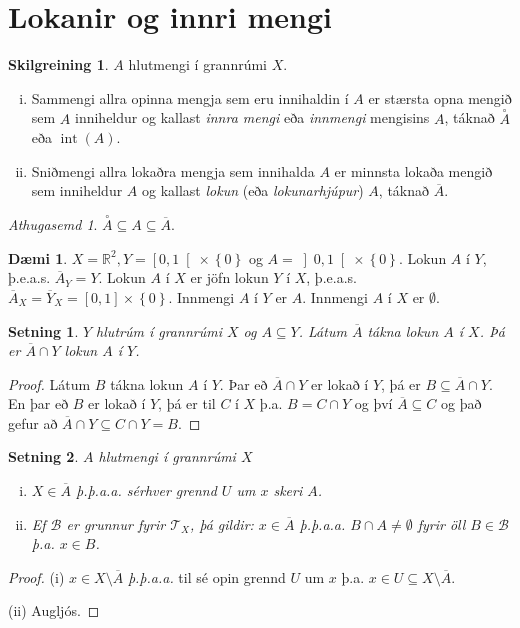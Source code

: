 \documentclass[a4paper,icelandic]{book}
\theoremstyle{definition}
\newtheorem{skilgr}{Skilgreining}[section]
\newtheorem{daemi}{Dæmi}[section]
\theoremstyle{plain}
\newtheorem{setn}{Setning}[section]
\theoremstyle{remark}
\newtheorem*{ath}{Athugasemd}
\newcommand{\R}{\mathbb{R}} %
\DeclareMathOperator{\innmengi}{int} %
\begin{document}
\section{Lokanir og innri mengi}
\begin{skilgr}
  $A$ hlutmengi í grannrúmi $X$.
  \begin{enumerate}[(i)]
  \item Sammengi allra opinna mengja sem eru innihaldin í $A$ er stærsta opna
    mengið sem $A$ inniheldur og kallast \emph{innra mengi}
    eða \emph{innmengi} mengisins $A$, táknað $\overset \circ A$
    eða $\innmengi(A)$.
  \item Sniðmengi allra lokaðra mengja sem innihalda $A$ er minnsta lokaða
    mengið sem inniheldur $A$ og kallast \emph{lokun} (eða
    \emph{lokunarhjúpur}) $A$, táknað $\overline A$.
  \end{enumerate}
\end{skilgr}
\begin{ath}
  $\overset \circ A \subseteq A \subseteq \overline A$.
\end{ath}
\begin{daemi}
  $X = \R^2, Y = \left[0,1\right[\times\left\{ 0 \right\}$ og $A =
  \left]0,1\right[\times\left\{ 0 \right\}$. Lokun $A$ í $Y$,
  þ.e.a.s. $\overline A_Y = Y$. Lokun $A$ í $X$ er jöfn lokun $Y$ í $X$,
  þ.e.a.s. $\overline A_X = \overline Y_X = \left[ 0,1 \right]\times\left\{ 0
  \right\}$. Innmengi $A$ í $Y$ er $A$. Innmengi $A$ í $X$ er $\emptyset$.
\end{daemi}
\begin{setn}
  $Y$ hlutrúm í grannrúmi $X$ og $A\subseteq Y$. Látum $\overline A$ tákna lokun
  $A$ í $X$. Þá er $\overline A\cap Y$ lokun $A$ í $Y$.
\end{setn}
\begin{proof}
  Látum $B$ tákna lokun $A$ í $Y$. Þar eð $\overline A\cap Y$ er lokað í $Y$, þá
  er $B\subseteq \overline A\cap Y$. En þar eð $B$ er lokað í $Y$, þá er til $C$
  í $X$ þ.a. $B = C\cap Y$ og því $\overline A \subseteq C$ og það gefur að
  $\overline A\cap Y \subseteq C\cap Y = B$.
\end{proof}
\begin{setn}
  $A$ hlutmengi í grannrúmi $X$
  \begin{enumerate}[(i)]
    \item $X\in\overline A$ \emph{þ.þ.a.a.} sérhver grennd $U$ um $x$ skeri $A$.
    \item Ef $\mathcal B$ er grunnur fyrir $\mathcal T_X$, þá gildir:
      $x\in\overline A$ \emph{þ.þ.a.a.} $B\cap A\neq\emptyset$ fyrir öll
      $B\in\mathcal B$ þ.a. $x\in B$.
  \end{enumerate}
\end{setn}
\begin{proof}
  (i) $x\in X\setminus \overline A$ \emph{þ.þ.a.a.} til sé opin grennd $U$ um
  $x$ þ.a. $x\in U\subseteq X\setminus \overline A$.

  (ii) Augljós.
\end{proof}
\end{document}
